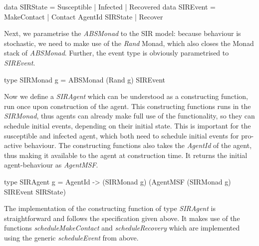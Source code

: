 \begin{HaskellCode}
data SIRState = Susceptible | Infected | Recovered
data SIREvent = MakeContact | Contact AgentId SIRState | Recover 
\end{HaskellCode}

Next, we parametrise the \textit{ABSMonad} to the SIR model: because behaviour is stochastic, we need to make use of the \textit{Rand} Monad, which also closes the Monad stack of \textit{ABSMonad}. Further, the event type is obviously parametrised to \textit{SIREvent}.

\begin{HaskellCode}
type SIRMonad g = ABSMonad (Rand g) SIREvent
\end{HaskellCode}

Now we define a \textit{SIRAgent} which can be understood as a constructing function, run once upon construction of the agent. This constructing functions runs in the \textit{SIRMonad}, thus agents can already make full use of the functionality, so they can schedule initial events, depending on their initial state. This is important for the susceptible and infected agent, which both need to schedule initial events for pro-active behaviour. The constructing functions also takes the \textit{AgentId} of the agent, thus making it available to the agent at construction time. It returns the initial agent-behaviour as \textit{AgentMSF}.

\begin{HaskellCode}
type SIRAgent g 
       = AgentId -> (SIRMonad g) (AgentMSF (SIRMonad g) SIREvent SIRState)
\end{HaskellCode}

The implementation of the constructing function of type \textit{SIRAgent} is straightforward and follows the specification given above. It makes use of the functions \textit{scheduleMakeContact} and \textit{scheduleRecovery} which are implemented using the generic \textit{scheduleEvent} from above.

